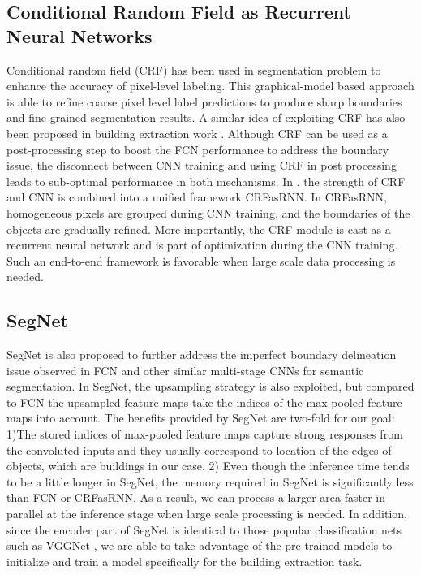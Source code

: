 \documentclass[journal]{IEEEtran}
\begin{document}
\subsection{Conditional Random Field as Recurrent Neural Networks}
Conditional random field (CRF) has been used in segmentation problem to enhance the accuracy of pixel-level labeling. This graphical-model based approach is able to refine coarse pixel level label predictions to produce sharp boundaries and fine-grained segmentation results. A similar idea of exploiting CRF has also been proposed in building extraction work \cite{Li2015}. Although CRF can be used as a post-processing step to boost the FCN performance to address the boundary issue, the disconnect between CNN training and using CRF in post processing leads to sub-optimal performance in both mechanisms. In \cite{ZhengJayasumanaRomera-ParedesEtAl2015}, the strength of CRF and CNN is combined into a unified framework CRFasRNN. In CRFasRNN, homogeneous pixels are grouped during CNN training, and the boundaries of the objects are gradually refined. More importantly, the CRF module is cast as a recurrent neural network and is part of optimization during the CNN training. Such an end-to-end framework is favorable when large scale data processing is needed.   

\subsection{SegNet}
SegNet \cite{BadrinarayananKendallCipolla2017} is also proposed to further address the imperfect boundary delineation issue observed in FCN and other similar multi-stage CNNs for semantic segmentation. In SegNet, the upsampling strategy is also exploited, but compared to FCN the upsampled feature maps take the indices of the max-pooled feature maps into account. The benefits provided by SegNet are two-fold for our goal: 1)The stored indices of max-pooled feature maps capture strong responses from the convoluted inputs and they usually correspond to location of the edges of objects, which are buildings in our case. 2) Even though the inference time tends to be a little longer in SegNet, the memory required in SegNet is significantly less than FCN \cite{BadrinarayananKendallCipolla2017} or CRFasRNN. As a result, we can process a larger area faster in parallel at the inference stage when large scale processing is needed. In addition, since the encoder part of SegNet is identical to those popular classification nets such as VGGNet \cite{SimonyanZisserman2015}, we are able to take advantage of the pre-trained models to initialize and train a model specifically for the building extraction task.
\end{document}
